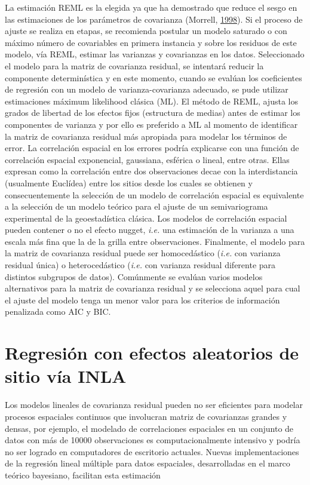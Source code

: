 \documentclass[11pt,b5paper,]{krantz}
\begin{document}
La estimación REML es la elegida ya que ha demostrado que reduce el
sesgo en las estimaciones de los parámetros de covarianza (Morrell,
\protect\hyperlink{ref-Morrell_1998}{1998}). Si el proceso de ajuste se
realiza en etapas, se recomienda postular un modelo saturado o con
máximo número de covariables en primera instancia y sobre los residuos
de este modelo, vía REML, estimar las varianzas y covarianzas en los
datos. Seleccionado el modelo para la matriz de covarianza residual, se
intentará reducir la componente determinística y en este momento, cuando
se evalúan los coeficientes de regresión con un modelo de
varianza-covarianza adecuado, se pude utilizar estimaciones máximum
likelihood clásica (ML). El método de REML, ajusta los grados de
libertad de los efectos fijos (estructura de medias) antes de estimar
los componentes de varianza y por ello es preferido a ML al momento de
identificar la matriz de covarianza residual más apropiada para modelar
los términos de error. La correlación espacial en los errores podría
explicarse con una función de correlación espacial exponencial,
gaussiana, esférica o lineal, entre otras. Ellas expresan como la
correlación entre dos observaciones decae con la interdistancia
(usualmente Euclídea) entre los sitios desde los cuales se obtienen y
consecuentemente la selección de un modelo de correlación espacial es
equivalente a la selección de un modelo teórico para el ajuste de un
semivariograma experimental de la geoestadística clásica. Los modelos de
correlación espacial pueden contener o no el efecto nugget, \emph{i.e.}
una estimación de la varianza a una escala más fina que la de la grilla
entre observaciones. Finalmente, el modelo para la matriz de covarianza
residual puede ser homocedástico (\emph{i.e.} con varianza residual
única) o heterocedástico (\emph{i.e.} con varianza residual diferente
para distintos subgrupos de datos). Comúnmente se evalúan varios modelos
alternativos para la matriz de covarianza residual y se selecciona aquel
para cual el ajuste del modelo tenga un menor valor para los criterios
de información penalizada como AIC y BIC.

\section{Regresión con efectos aleatorios de sitio vía
INLA}\label{regresiuxf3n-con-efectos-aleatorios-de-sitio-vuxeda-inla}

Los modelos lineales de covarianza residual pueden no ser eficientes
para modelar procesos espaciales continuos que involucran matriz de
covarianzas grandes y densas, por ejemplo, el modelado de correlaciones
espaciales en un conjunto de datos con más de 10000 observaciones es
computacionalmente intensivo y podría no ser logrado en computadores de
escritorio actuales. Nuevas implementaciones de la regresión lineal
múltiple para datos espaciales, desarrolladas en el marco teórico
bayesiano, facilitan esta estimación
\end{document}
